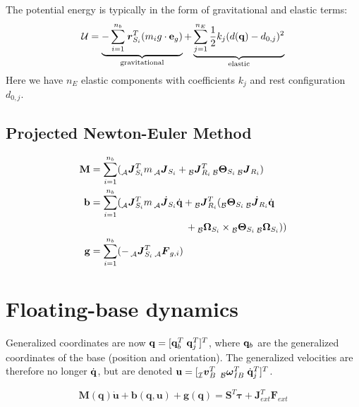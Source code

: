 \documentclass[a4paper, 8pt]{extarticle}
\newcommand{\mvec}[3]{  \prescript{}{\mathcal{#1}}{\bm{#2}}  _{#3} }
\newcommand{\mdvec}[3]{ \prescript{}{\mathcal{#1}}{\dot{\bm #2}} _{#3} }
\begin{document}
\begin{multicols*}{3}
The potential energy is typically in the form of gravitational and elastic terms:
$$\mathcal U = \underbrace{ -\sum_{i=1}^{n_b} \mvec{}{r}{S_i}^T (m_i g \cdot {\bf e}_{g}) }_{\text{gravitational}} + \underbrace{ \sum_{j = 1}^{n_E} \frac 12 k_j(d({\bf q}) - d_{0,j})^2}_{\text{elastic}}$$
Here we have $n_E$ elastic components with coefficients $k_j$ and rest configuration $d_{0,j}$.



\subsection*{Projected Newton-Euler Method}
\begin{align*}
\mathbf M &= \sum_{i = 1}^{n_b} (\mvec{A}{J}{S_i}^T m \mvec{A}{J}{S_i} + \mvec{B}{J}{R_i}^T \mvec{B}{\Theta}{S_i} \mvec{B}{J}{R_i}) \\
\mathbf b &= \sum_{i = 1}^{n_b} (\mvec{A}{J}{S_i}^T m \mdvec{A}{J}{S_i}\dot{\bf q} + \mvec{B}{J}{R_i}^T ( \mvec{B}{\Theta}{S_i} \mdvec{B}{J}{R_i}\dot{\bf q}\\
& \mkern174.5mu + \mvec{B}{\Omega}{S_i} \times \mvec{B}{\Theta}{S_i} \mvec{B}{\Omega}{S_i})) \\
\mathbf g &= \sum_{i=1}^{n_b}(-\mvec{A}{J}{S_i}^T \mvec{A}{F}{g,i})
\end{align*}





\section{Floating-base dynamics}

Generalized coordinates are now $\mathbf q = [ {\bf q} _b^T \;  {\bf q}_j^T ]^T$, where ${\bf q}_b$ are the generalized coordinates of the base (position and orientation). The generalized velocities are therefore no longer $\dot{\bf q}$, but are denoted ${\bf u} = [\mvec{I}{v}{B}^T \; \mvec{B}{\omega}{IB}^T \; \dot{\bf q}_j^T ]^T$.

$$\boxed{\mathbf{ M(q)\dot{u} + b(q, u) + g(q)} = \mathbf{S}^T\bm\tau + \mathbf{J}_{ext}^T \mathbf F_{ext}}$$


\end{multicols*}
\end{document}
